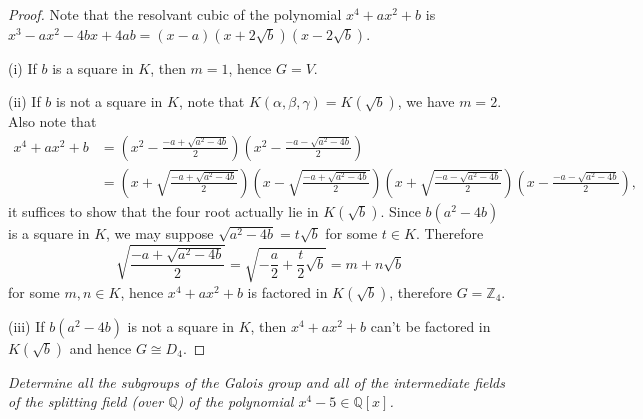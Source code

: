 \begin{proof}
Note that the resolvant cubic of the polynomial $x^4+ax^2+b$ is $x^3-ax^2-4bx+4ab=(x-a)(x+2\sqrt{b})(x-2\sqrt{b})$. \par
(i) If $b$ is a square in $K$, then $m=1$, hence $G=V$.\par
(ii) If $b$ is not a square in $K$, note that $K(\alpha,\beta,\gamma)=K(\sqrt{b})$, we have $m=2$. Also note that 
$$
\begin{aligned}
x^4+ax^2+b&=\left( x^2-\frac{-a+\sqrt{a^2-4b}}{2} \right) \left( x^2-\frac{-a-\sqrt{a^2-4b}}{2} \right) 
\\
&=\left( x+\sqrt{\frac{-a+\sqrt{a^2-4b}}{2}} \right) \left( x-\sqrt{\frac{-a+\sqrt{a^2-4b}}{2}} \right) \left( x+\sqrt{\frac{-a-\sqrt{a^2-4b}}{2}} \right) \left( x-\frac{-a-\sqrt{a^2-4b}}{2} \right) ,
\end{aligned}
$$
it suffices to show that the four root actually lie in $K(\sqrt{b})$. Since $b(a^2-4b)$ is a square in $K$, we may suppose $\sqrt{a^2-4b}=t\sqrt{b}$ for some $t\in K$. Therefore 
$$
\sqrt{\frac{-a+\sqrt{a^2-4b}}{2}}=\sqrt{-\frac{a}{2}+\frac{t}{2}\sqrt{b}}=m+n\sqrt{b}
$$
for some $m,n\in K$, hence $x^4+ax^2+b$ is factored in $K(\sqrt{b})$, therefore $G=\mathbb{Z}_4$.\par
(iii) If $b(a^2-4b)$ is not a square in $K$, then $x^4+ax^2+b$ can't be factored in $K(\sqrt{b})$ and hence $G\cong D_4$.
\end{proof}
\begin{problem}\em
Determine all the subgroups of the Galois group and all of the intermediate fields of the splitting field (over $\mathbb{Q}$) of the polynomial $x^4-5\in \mathbb{Q}[x]$.
\end{problem}
